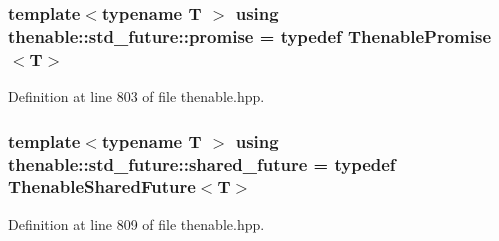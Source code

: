 \subsubsection[{\texorpdfstring{promise}{promise}}]{\setlength{\rightskip}{0pt plus 5cm}template$<$typename T $>$ using {\bf thenable\+::std\+\_\+future\+::promise} = typedef {\bf Thenable\+Promise}$<$T$>$}\hypertarget{namespacethenable_1_1std__future_a588bcec180d4eb0eec47a9a9f1dd2feb}{}\label{namespacethenable_1_1std__future_a588bcec180d4eb0eec47a9a9f1dd2feb}


Definition at line 803 of file thenable.\+hpp.

\subsubsection[{\texorpdfstring{shared\+\_\+future}{shared_future}}]{\setlength{\rightskip}{0pt plus 5cm}template$<$typename T $>$ using {\bf thenable\+::std\+\_\+future\+::shared\+\_\+future} = typedef {\bf Thenable\+Shared\+Future}$<$T$>$}\hypertarget{namespacethenable_1_1std__future_ab2ceaa9adac08c6395df3a258b5df5c5}{}\label{namespacethenable_1_1std__future_ab2ceaa9adac08c6395df3a258b5df5c5}


Definition at line 809 of file thenable.\+hpp.

